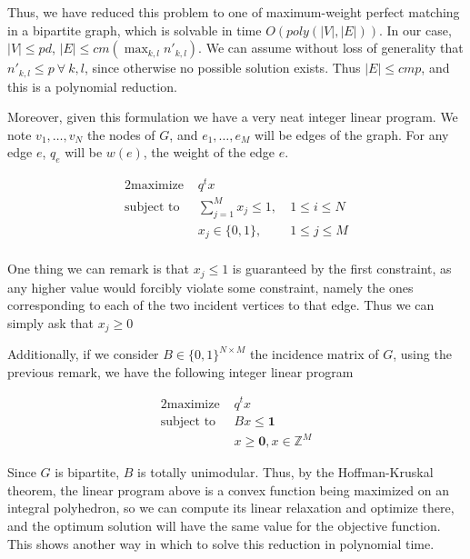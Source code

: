 Thus, we have reduced this problem to one of maximum-weight perfect matching in a bipartite graph, which is solvable in time $O(poly(|V|, |E|))$. In our case, $|V| \le pd$, $|E| \le cm(\max_{k, l} n'_{k, l})$. We can assume without loss of generality that $n'_{k, l} \le p\ \forall\ k, l$, since otherwise no possible solution exists. Thus $|E| \le cmp$, and this is a polynomial reduction.

Moreover, given this formulation we have a very neat integer linear program. We note $v_1, \dots, v_N$ the nodes of $G$, and $e_1, \dots, e_M$ will be edges of the graph. For any edge $e$, $q_e$ will be $w(e)$, the weight of the edge $e$.

\begin{alignat*}{2}
  \text{maximize }   & q^t x \\
  \text{subject to } & \sum_{j=1}^M x_j \le 1, \ & 1 \le i \le N\\
                     & x_j \in \{0, 1\}, \ & 1 \le j \le M\\
\end{alignat*}

One thing we can remark is that $x_j \le 1$ is guaranteed by the first constraint, as any higher value would forcibly violate some constraint, namely the ones corresponding to each of the two incident vertices to that edge. Thus we can simply ask that $x_j \ge 0$

Additionally, if we consider $B \in \{0, 1\}^{N \times M}$ the incidence matrix of $G$, using the previous remark, we have the following integer linear program

\begin{alignat*}{2}
  \text{maximize } & q^t x \\
  \text{subject to } & Bx \le \mathbf{1}\\
                     & x \ge \mathbf{0}, x \in \mathbb{Z}^M
\end{alignat*}

Since $G$ is bipartite, $B$ is totally unimodular. Thus, by the Hoffman-Kruskal theorem, the linear program above is a convex function being maximized on an integral polyhedron, so we can compute its linear relaxation and optimize there, and the optimum solution will have the same value for the objective function. This shows another way in which to solve this reduction in polynomial time.
